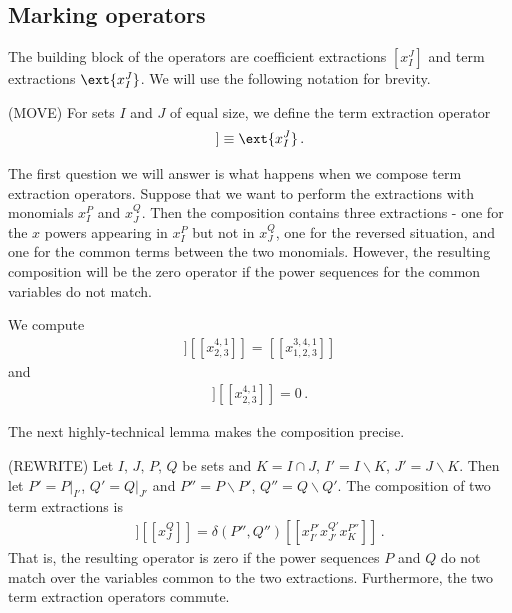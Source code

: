 \subsection{Marking operators}

The building block of the operators are coefficient extractions $[x_I^J]$ and term extractions $\ext{x_I^J}$. We will use the following notation for brevity.
\begin{definition} (MOVE) For sets $I$ and $J$ of equal size, we define the term extraction operator
\begin{align}
	[[x_I^J]] \equiv \ext{x_I^J}\,.
\end{align}
\end{definition}
The first question we will answer is what happens when we compose term extraction operators. Suppose that we want to perform the extractions with monomials $x_I^P$ and $x_J^Q$. Then the composition contains three extractions - one for the $x$ powers appearing in $x_I^P$ but not in $x_J^Q$, one for the reversed situation, and one for the common terms between the two monomials. However, the resulting composition will be the zero operator if the power sequences for the common variables do not match.
\begin{example} We compute
\begin{align}
	[[x_{1,2}^{3,4}]][[x_{2,3}^{4,1}]] = [[x_{1,2,3}^{3,4,1}]]
\end{align}
and
\begin{align}
	[[x_{1,2}^{3,2}]][[x_{2,3}^{4,1}]] = 0\,.
\end{align}
\end{example}
The next highly-technical lemma makes the composition precise.
\begin{lemma} (REWRITE) Let $I,\, J,\, P,\, Q$ be sets and $K = I\cap J$, $I' = I\backslash K$, $J' = J \backslash K$. Then let $P' = P|_{I'}$, $Q' = Q|_{J'}$ and $P'' = P\backslash P'$, $Q'' = Q\backslash Q'$. The composition of two term extractions is
\begin{align}
	[[x_I^P]][[x_J^Q]] = \delta(P'',Q'')[[x_{I'}^{P'}x_{J'}^{Q'}x_K^{P''}]]\,.
\end{align}
That is, the resulting operator is zero if the power sequences $P$ and $Q$ do not match over the variables common to the two extractions. Furthermore, the two term extraction operators commute.
\end{lemma}

